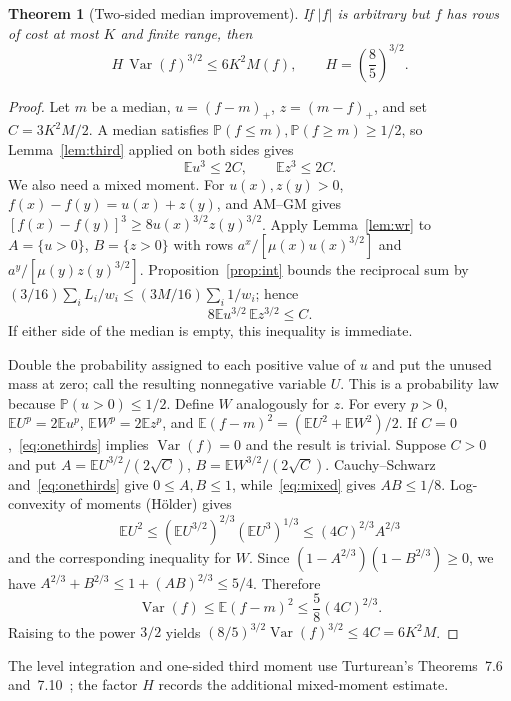 \documentclass[11pt]{article}
\numberwithin{equation}{section}
\newtheorem{theorem}{Theorem}[section]
\theoremstyle{remark}
\newcommand{\E}{\mathbb E}
\newcommand{\Prb}{\mathbb P}
\newcommand{\Var}{\operatorname{Var}}
\newcommand{\pos}[1]{(#1)_{+}}
\begin{document}
\begin{theorem}[Two-sided median improvement]\label{thm:median}
If $|f|$ is arbitrary but $f$ has rows of cost at most $K$ and finite range, then
\begin{equation}\label{eq:median}
 H\,\Var(f)^{3/2}\le 6K^2M(f),\qquad H=\left(\frac85\right)^{3/2}.
\end{equation}
\end{theorem}
\begin{proof}
Let $m$ be a median, $u=\pos{f-m}$, $z=\pos{m-f}$, and set $C=3K^2M/2$. A median satisfies $\Prb(f\le m),\Prb(f\ge m)\ge1/2$, so Lemma~\ref{lem:third} applied on both sides gives
\begin{equation}\label{eq:onethirds}
 \E u^3\le2C,\qquad\E z^3\le2C.
\end{equation}
We also need a mixed moment. For $u(x),z(y)>0$, $f(x)-f(y)=u(x)+z(y)$, and AM--GM gives
$[f(x)-f(y)]^3\ge8u(x)^{3/2}z(y)^{3/2}$.
Apply Lemma~\ref{lem:wr} to $A=\{u>0\}$, $B=\{z>0\}$ with rows
$a^x/[\mu(x)u(x)^{3/2}]$ and $a^y/[\mu(y)z(y)^{3/2}]$. Proposition~\ref{prop:int} bounds the reciprocal sum by $(3/16)\sum_iL_i/w_i\le(3M/16)\sum_i1/w_i$; hence
\begin{equation}\label{eq:mixed}
 8\E u^{3/2}\,\E z^{3/2}\le C.
\end{equation}
If either side of the median is empty, this inequality is immediate.

Double the probability assigned to each positive value of $u$ and put the unused mass at zero; call the resulting nonnegative variable $U$. This is a probability law because $\Prb(u>0)\le1/2$. Define $W$ analogously for $z$. For every $p>0$, $\E U^p=2\E u^p$, $\E W^p=2\E z^p$, and
$\E(f-m)^2=(\E U^2+\E W^2)/2$.
If $C=0$,~\eqref{eq:onethirds} implies $\Var(f)=0$ and the result is trivial. Suppose $C>0$ and put
$A=\E U^{3/2}/(2\sqrt C)$, $B=\E W^{3/2}/(2\sqrt C)$.
Cauchy--Schwarz and~\eqref{eq:onethirds} give $0\le A,B\le1$, while~\eqref{eq:mixed} gives $AB\le1/8$. Log-convexity of moments (H\"older) gives
\[
 \E U^2\le(\E U^{3/2})^{2/3}(\E U^3)^{1/3}
 \le(4C)^{2/3}A^{2/3}
\]
and the corresponding inequality for $W$. Since
$(1-A^{2/3})(1-B^{2/3})\ge0$, we have
$A^{2/3}+B^{2/3}\le1+(AB)^{2/3}\le5/4$. Therefore
\[
 \Var(f)\le\E(f-m)^2\le\frac58(4C)^{2/3}.
\]
Raising to the power $3/2$ yields $(8/5)^{3/2}\Var(f)^{3/2}\le4C=6K^2M$.
\end{proof}
The level integration and one-sided third moment use Turturean's Theorems~7.6 and~7.10~\cite{Tur26}; the factor $H$ records the additional mixed-moment estimate.
\end{document}
